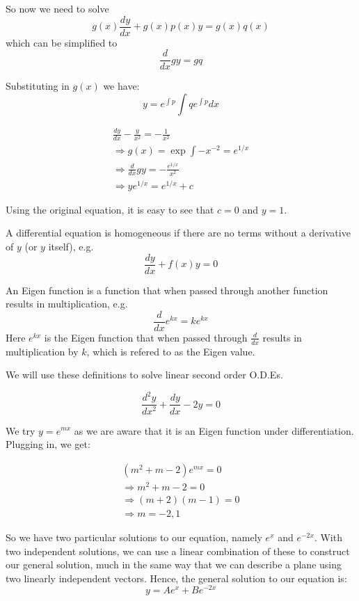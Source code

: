 \documentclass[a4paper,10pt]{article}
\begin{document}
So now we need to solve
\[
	g(x)\frac{dy}{dx} + g(x)p(x)y = g(x)q(x)
\]
which can be simplified to
\[
	\frac{d}{dx} gy = gq
\]

Substituting in $g(x)$ we have:
\[
	y = e^{\int p} \int q e^{\int p} dx
\]

\begin{ex}
	\begin{gather*}
		\frac{dy}{dx} - \frac{y}{x^2} = - \frac{1}{x^2} \\
		\Rightarrow g(x) = \exp{\int -x^{-2}} = e^{1/x} \\
		\Rightarrow \frac{d}{dx} gy = - \frac{e^{1/x}}{x^2} \\
		\Rightarrow y e^{1/x} = e^{1/x} + c
	\end{gather*}

	Using the original equation, it is easy to see that $c=0$ and $y=1$.
\end{ex}

\begin{defn}
	A differential equation is homogeneous if there are no terms
	without a derivative of $y$ (or $y$ itself), e.g.
	\[
		\frac{dy}{dx} + f(x)y = 0
	\]
\end{defn}

\begin{defn}
	An Eigen function is a function that when passed through another
	function results in multiplication, e.g.
	\[ \frac{d}{dx} e^{kx} = ke^{kx} \]
	Here $e^{kx}$ is the Eigen function that when passed through
	$\frac{d}{dx}$ results in multiplication by $k$, which is
	refered to as the Eigen value.
\end{defn}

We will use these definitions to solve linear second order O.D.Es.

\begin{ex}
	\[
		\frac{d^2y}{dx^2} + \frac{dy}{dx} - 2y = 0
	\]

	We try $y = e^{mx}$ as we are aware that it is an Eigen function
	under differentiation. Plugging in, we get:

	\begin{gather*}
		(m^2 + m - 2)e^{mx} = 0 \\
		\Rightarrow m^2 + m - 2 = 0 \\
		\Rightarrow (m+2)(m-1) = 0 \\
		\Rightarrow m = -2, 1
	\end{gather*}

	So we have two particular solutions to our equation, namely
	$e^x$ and $e^{-2x}$. With two independent solutions, we can use a
	linear combination of these to construct our general solution, much
	in the same way that we can describe a plane using two linearly
	independent vectors. Hence, the general solution to our equation is:
	\[
		y = Ae^x + Be^{-2x}
	\]
\end{ex}
\end{document}
